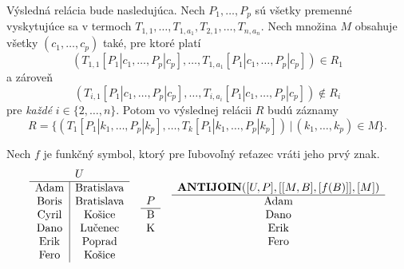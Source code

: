 Výsledná relácia bude nasledujúca. Nech $P_1, \dots, P_p$ sú všetky premenné vyskytujúce sa v
termoch $T_{1, 1}, \dots, T_{1, a_1}, T_{2, 1}, \dots, T_{n, a_n}$. Nech množina $M$ obsahuje všetky
$(c_1, \dots, c_p)$ také, pre ktoré platí 
$$(T_{1, 1}[P_1|c_1, \dots, P_p|c_p], \dots, T_{1, a_1}[P_1|c_1, \dots, P_p|c_p]) \in R_1$$ a
zároveň
$$(T_{i, 1}[P_1|c_1, \dots, P_p|c_p], \dots, T_{i, a_i}[P_1|c_1, \dots, P_p|c_p]) \notin R_i$$
pre \textit{každé} $i \in \{2, \dots, n\}$.
Potom vo výslednej relácii $R$ budú záznamy 
$$R = \{(T_1[P_1|k_1, \dots, P_p|k_p], \dots, T_k[P_1|k_1, \dots, P_p|k_p]) \, | \, (k_1, \dots,
k_p) \in M\} \text{.}$$
    \begin{priklad}
    \begin{center}
Nech $f$ je funkčný symbol, ktorý pre ľubovoľný reťazec vráti jeho prvý znak.
        \[
        \begin{array}{c c c}
            \begin{array}{c|c}
                \multicolumn{2}{c}{U} \\ \hline
                \text{Adam}   & \text{Bratislava} \\
                \text{Boris}  & \text{Bratislava} \\
                \text{Cyril}  & \text{Košice}     \\
                \text{Dano}   & \text{Lučenec}    \\
                \text{Erik}   & \text{Poprad}     \\
                \text{Fero}   & \text{Košice}     \\
            \end{array}
            &
            \begin{array}{c}
                \multicolumn{1}{c}{P} \\ \hline
                \text{B} \\
                \text{K} \\
            \end{array}
            &
            \begin{array}{c}
                \multicolumn{1}{c}{\ANTIJOIN([U, P], [[M, B], [f(B)]], [M])} \\ \hline
                \text{Adam} \\
                \text{Dano} \\
                \text{Erik} \\
                \text{Fero} \\
            \end{array}
        \end{array}
        \]
    \end{center}
    \end{priklad}
        
